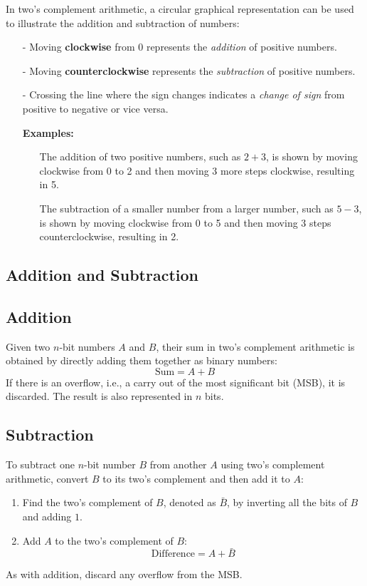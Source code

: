 \documentclass[12pt,openany, tikz,border=10pt]{book}
\begin{document}
In two's complement arithmetic, a circular graphical representation can be used to illustrate the addition and subtraction of numbers:
\begin{itemize}
  \item[-] Moving \textbf{clockwise} from 0 represents the \textit{addition} of positive numbers.
  \item[-] Moving \textbf{counterclockwise} represents the \textit{subtraction} of positive numbers.
  \item[-] Crossing the line where the sign changes indicates a \textit{change of sign} from positive to negative or vice versa.
  \item[] \textbf{Examples:}
    \begin{itemize}
        \item[] The addition of two positive numbers, such as \(2 + 3\), is shown by moving clockwise from 0 to 2 and then moving 3 more steps clockwise, resulting in 5.
        \item[] The subtraction of a smaller number from a larger number, such as \(5 - 3\), is shown by moving clockwise from 0 to 5 and then moving 3 steps counterclockwise, resulting in 2.  
    \end{itemize}
\end{itemize}

\subsection{Addition and Subtraction}
\subsection{Addition}
Given two \(n\)-bit numbers \(A\) and \(B\), their sum in two's complement arithmetic is obtained by directly adding them together as binary numbers:
\begin{equation}
    \text{Sum} = A + B
\end{equation}
If there is an overflow, i.e., a carry out of the most significant bit (MSB), it is discarded. The result is also represented in \(n\) bits.

\subsection{Subtraction}
To subtract one \(n\)-bit number \(B\) from another \(A\) using two's complement arithmetic, convert \(B\) to its two's complement and then add it to \(A\):
\begin{enumerate}
    \item Find the two's complement of \(B\), denoted as \(\bar{B}\), by inverting all the bits of \(B\) and adding \(1\).
    \item Add \(A\) to the two's complement of \(B\):
    \begin{equation}
        \text{Difference} = A + \bar{B}
    \end{equation}
\end{enumerate}
As with addition, discard any overflow from the MSB.
\end{document}
